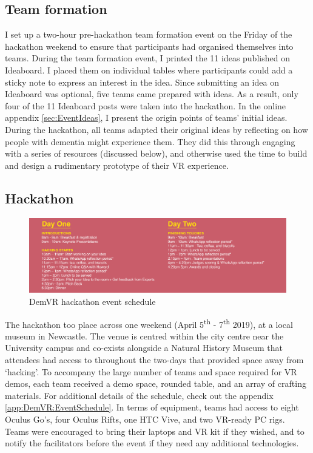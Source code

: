 \subsection{Team formation}
\label{sec:TeamFormation}
I set up a two-hour pre-hackathon team formation event on the Friday of the hackathon weekend to ensure that participants had organised themselves into teams. During the team formation event, I printed the 11 ideas published on Ideaboard. I placed them on individual tables where participants could add a sticky note to express an interest in the idea. Since submitting an idea on Ideaboard was optional, five teams came prepared with ideas. As a result, only four of the 11 Ideaboard posts were taken into the hackathon. In the online appendix \ref{sec:EventIdeas}, I present the origin points of teams’ initial ideas. During the hackathon, all teams adapted their original ideas by reflecting on how people with dementia might experience them. They did this through engaging with a series of resources (discussed below), and otherwise used the time to build and design a rudimentary prototype of their VR experience. 

\subsection{Hackathon}
\label{sec:HackathonEvent}
\begin{figure}[htp]
\centering
\includegraphics[width=1\linewidth]{Images/DemVR/DemVRHackathonSchedule.png}
\caption{DemVR hackathon event schedule}
\label{fig:schedule}
\end{figure}
The hackathon too place across one weekend (April 5\textsuperscript{th} - 7\textsuperscript{th} 2019), at a local museum in Newcastle. The venue is centred within the city centre near the University campus and co-exists alongside a Natural History Museum that attendees had access to throughout the two-days that provided space away from ‘hacking’. To accompany the large number of teams and space required for VR demos, each team received a demo space, rounded table, and an array of crafting materials. For additional details of the schedule, check out the appendix \ref{app:DemVR:EventSchedule}. In terms of equipment, teams had access to eight Oculus Go’s, four Oculus Rifts, one HTC Vive, and two VR-ready PC rigs. Teams were encouraged to bring their laptops and VR kit if they wished, and to notify the facilitators before the event if they need any additional technologies.

